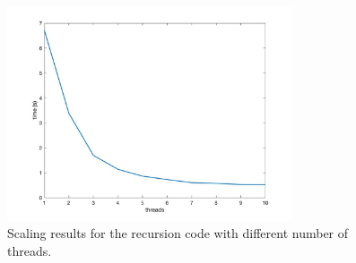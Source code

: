 \documentclass[unicode,11pt,a4paper,oneside,numbers=endperiod,openany]{scrartcl}
\begin{document}
\begin{figure}[h]
\centering
\includegraphics[width=0.75\textwidth]{Figures/recurScaling.jpg}
\caption{Scaling results for the recursion code with different number of threads.}\label{fig:recurScaling}
\end{figure}
\end{document}
